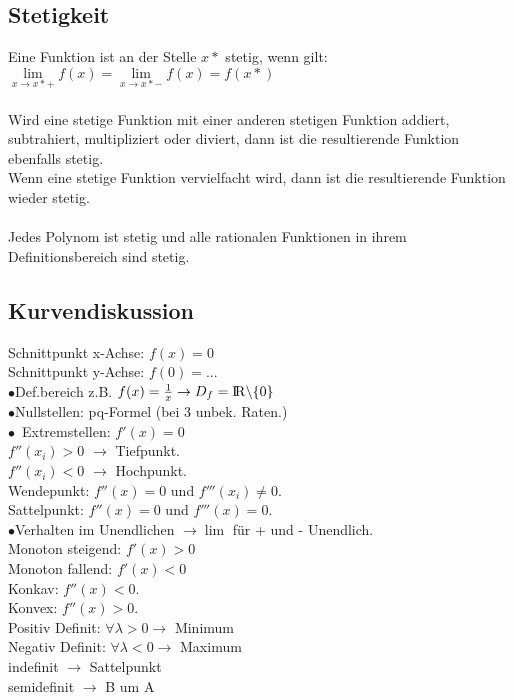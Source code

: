 \documentclass[a4paper,landscape, 11pt]{article}
\newcommand{\limFromTo}[2]{ \lim\limits_{#2 \rightarrow #1}}
\begin{document}
\begin{multicols}{5}
\begin{small}
              \subsection{Stetigkeit}
                  Eine Funktion ist an der Stelle $x*$ stetig, wenn gilt:\\
                  $\limFromTo{x*+}{x} f(x) = \limFromTo{x*-}{x} f(x) = f(x*)$
                  \\ \\
                  Wird eine stetige Funktion mit einer anderen stetigen Funktion addiert, subtrahiert, multipliziert oder diviert, dann ist die resultierende Funktion ebenfalls stetig.\\
                  Wenn eine stetige Funktion vervielfacht wird, dann ist die resultierende Funktion wieder stetig. \\
                  \\
                  Jedes Polynom ist stetig und alle rationalen Funktionen in ihrem Definitionsbereich sind stetig.
                                    
              \subsection{Kurvendiskussion}
              \noindent
             	  Schnittpunkt x-Achse: $f(x) = 0$ \\
              	  Schnittpunkt y-Achse:  $f(0) = ...$\\
              	  $\bullet$Def.bereich z.B. $f(x)= \frac{1}{x} \rightarrow D_f={\rm I\!R}\backslash \{0\}$\\
              	  $\bullet$Nullstellen: pq-Formel (bei 3 unbek. Raten.)\\
                  $\bullet$\ Extremstellen: $f'(x) = 0$  \\
                  $f''(x_i) > 0$ $\rightarrow$ Tiefpunkt.\\
                  $f''(x_i) < 0$ $\rightarrow$ Hochpunkt. \\
                  Wendepunkt: $f''(x) = 0$ und $f'''(x_i) \neq 0$. \\
                  Sattelpunkt: $f''(x) = 0$ und $f'''(x) = 0$. \\
                  $\bullet$Verhalten im Unendlichen $\rightarrow \lim$ für + und - Unendlich.\\
                  Monoton steigend: $f'(x) > 0$ \\
                  Monoton fallend: $f'(x) < 0$ \\
                  Konkav: $f''(x) < 0$.\\
                  Konvex: $f''(x) > 0$.\\
                  Positiv Definit: $\forall\lambda>0 \rightarrow$ Minimum\\
                  Negativ Definit: $\forall\lambda<0 \rightarrow$ Maximum\\
                  indefinit $\rightarrow$ Sattelpunkt\\
                  semidefinit $\rightarrow$ B um A\\
              

\end{small}
\end{multicols}
\end{document}
